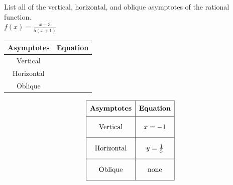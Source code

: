 \documentclass[addpoints]{exam}
\begin{document}
\begin{questions}
\newpage
\newpage

\question[5] List all of the vertical, horizontal, and oblique asymptotes of the rational function.\\
        
    \(\displaystyle{ f(x) = \displaystyle{\frac{x + 3}{5(x + 1)}} }\)
    
    \renewcommand{\arraystretch}{3}
    \begin{tabular}{|c|c|}
        \hline
        \textbf{Asymptotes}  & \textbf{Equation} \\ \hline
        Vertical   & \hspace{50mm} \\ \hline
        Horizontal &  \\ \hline
        Oblique    &  \\ \hline
    \end{tabular}
\begin{solution}
\[\begin{array}{|c|c|} \hline \rule[-0.8em]{0pt}{2.2em} \textbf{Asymptotes} & \textbf{Equation} \\ \hline \rule[-1.2em]{0pt}{3em} \text{Vertical} & x = -1 \\ \hline \rule[-1.2em]{0pt}{3em} \text{Horizontal} & y = \frac{1}{5} \\ \hline \rule[-1.2em]{0pt}{3em} \text{Oblique} & \text{none} \\ \hline \end{array}\]
\end{solution}


\end{questions}
\end{document}
